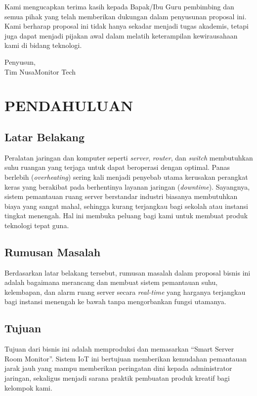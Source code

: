 \documentclass[12pt, a4paper]{article}
\begin{document}
Kami mengucapkan terima kasih kepada Bapak/Ibu Guru pembimbing dan semua pihak yang telah memberikan dukungan dalam penyusunan proposal ini. Kami berharap proposal ini tidak hanya sekadar menjadi tugas akademis, tetapi juga dapat menjadi pijakan awal dalam melatih keterampilan kewirausahaan kami di bidang teknologi.

\vspace{2cm}
\begin{flushright}
Penyusun, \\
\vspace{1.5cm}
Tim NusaMonitor Tech
\end{flushright}

\newpage

\tableofcontents
\newpage

\section{PENDAHULUAN}

\subsection{Latar Belakang}
Peralatan jaringan dan komputer seperti \textit{server}, \textit{router}, dan \textit{switch} membutuhkan suhu ruangan yang terjaga untuk dapat beroperasi dengan optimal. Panas berlebih (\textit{overheating}) sering kali menjadi penyebab utama kerusakan perangkat keras yang berakibat pada berhentinya layanan jaringan (\textit{downtime}). Sayangnya, sistem pemantauan ruang server berstandar industri biasanya membutuhkan biaya yang sangat mahal, sehingga kurang terjangkau bagi sekolah atau instansi tingkat menengah. Hal ini membuka peluang bagi kami untuk membuat produk teknologi tepat guna.

\subsection{Rumusan Masalah}
Berdasarkan latar belakang tersebut, rumusan masalah dalam proposal bisnis ini adalah bagaimana merancang dan membuat sistem pemantauan suhu, kelembapan, dan alarm ruang server secara \textit{real-time} yang harganya terjangkau bagi instansi menengah ke bawah tanpa mengorbankan fungsi utamanya.

\subsection{Tujuan}
Tujuan dari bisnis ini adalah memproduksi dan memasarkan ``Smart Server Room Monitor''. Sistem IoT ini bertujuan memberikan kemudahan pemantauan jarak jauh yang mampu memberikan peringatan dini kepada administrator jaringan, sekaligus menjadi sarana praktik pembuatan produk kreatif bagi kelompok kami.
\end{document}
